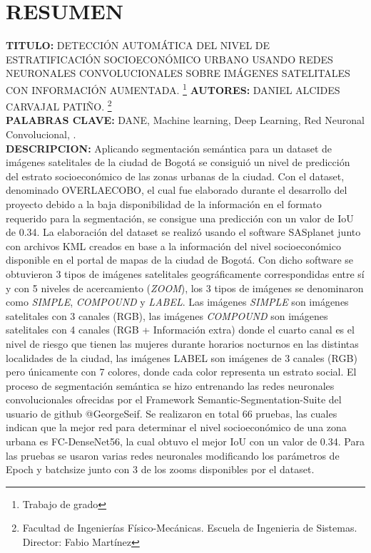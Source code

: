     \newpage
	\tableofcontents
	\newpage \listoffigures
	\newpage \listoftables

	\setlength{\parskip}{\baselineskip} %

\renewcommand{\thefootnote}{\fnsymbol{footnote}}

	\newpage\chapter*{RESUMEN}

	
    \textbf{TITULO:} DETECCIÓN AUTOMÁTICA DEL NIVEL DE ESTRATIFICACIÓN SOCIOECONÓMICO URBANO USANDO REDES NEURONALES CONVOLUCIONALES SOBRE IMÁGENES SATELITALES CON INFORMACIÓN AUMENTADA. 
    \footnote{Trabajo de grado}
    \textbf{AUTORES:} DANIEL ALCIDES CARVAJAL PATIÑO. \footnote{Facultad de Ingenierías Físico-Mecánicas.  Escuela de Ingenieria de Sistemas. Director: Fabio Martínez}\\
\textbf{PALABRAS CLAVE:} DANE, Machine learning, Deep Learning, Red Neuronal Convolucional, .	\\
\textbf{DESCRIPCION:}    Aplicando segmentación semántica para un dataset de imágenes satelitales de la ciudad de Bogotá se consiguió un nivel de predicción del estrato socioeconómico de las zonas urbanas de la ciudad. Con el dataset, denominado OVERLAECOBO, el cual fue elaborado durante el desarrollo del proyecto debido a la baja disponibilidad de la información en el formato requerido para la segmentación, se consigue una predicción con un valor de IoU de 0.34. La elaboración del dataset se realizó usando el software SASplanet junto con archivos KML creados en base a la información del nivel socioeconómico disponible en el portal de mapas de la ciudad de Bogotá. Con dicho software se obtuvieron 3 tipos de imágenes satelitales geográficamente correspondidas entre sí y con 5 niveles de acercamiento (\textit{ZOOM}), los 3 tipos de imágenes se denominaron como \textit{SIMPLE}, \textit{COMPOUND} y \textit{LABEL}. Las imágenes \textit{SIMPLE} son imágenes satelitales con 3 canales (RGB), las imágenes \textit{COMPOUND} son imágenes satelitales con 4 canales (RGB + Información extra) donde el cuarto canal es el nivel de riesgo que tienen las mujeres durante horarios nocturnos en las distintas localidades de la ciudad, las imágenes LABEL son imágenes de 3 canales (RGB) pero únicamente con 7 colores, donde cada color representa un estrato social. El proceso de segmentación semántica se hizo entrenando las redes neuronales convolucionales ofrecidas por el Framework Semantic-Segmentation-Suite del usuario de github @GeorgeSeif. Se realizaron en total 66 pruebas, las cuales indican que la mejor red para determinar el nivel socioeconómico de una zona urbana es FC-DenseNet56, la cual obtuvo el mejor IoU con un valor de 0.34. Para las pruebas se usaron varias redes neuronales modificando los parámetros de Epoch y batchsize junto con 3 de los zooms disponibles por el dataset. 
 
